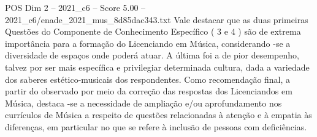 \begin{textsample}{POS Dim 2 – 2021\_c6 – Score 5.00 – 2021\_c6/enade\_2021\_mus\_8d85dac343.txt}
Vale destacar que as duas primeiras Questões do Componente de Conhecimento Específico ( 3 e 4 ) são de extrema importância para a formação do Licenciando em Música, considerando -se a diversidade de espaços onde poderá atuar.
A última foi a de pior desempenho, talvez por ser mais específica e privilegiar determinada cultura, dada a variedade dos saberes estético-musicais dos respondentes.
Como recomendação final, a partir do observado por meio da correção das respostas dos Licenciandos em Música, destaca -se a necessidade de ampliação e/ou aprofundamento nos currículos de Música a respeito de questões relacionadas à atenção e à empatia às diferenças, em particular no que se refere à inclusão de pessoas com deficiências.

\end{textsample}
